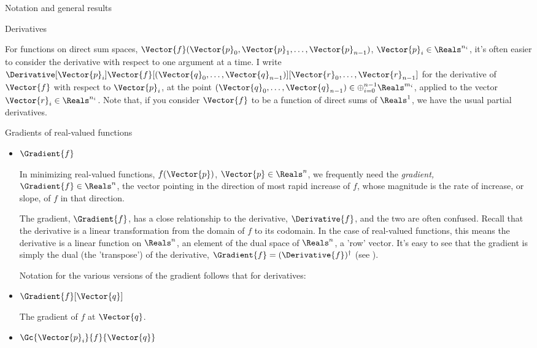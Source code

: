 \begin{plSection}{Notation and general results}
\begin{plSection}{Derivatives}
\begin{itemize}
For functions on direct sum spaces,
$\Vector{f}(\Vector{p}_0,\Vector{p}_1,\ldots,
\Vector{p}_{n-1})$, 
$\Vector{p}_i \in \Reals^{n_i}$,
it's often easier to consider the derivative
with respect to one argument at a time.
I write 
$\Derivative[\Vector{p}_i]{\Vector{f}}
[(\Vector{q}_0,\ldots,\Vector{q}_{n-1})]
[\Vector{r}_0,\ldots,\Vector{r}_{n-1}]$
for the derivative of $\Vector{f}$ with respect to $\Vector{p}_i$,
at the point 
$(\Vector{q}_0,\ldots,\Vector{q}_{n-1})
 \in \oplus_{i=0}^{n-1} \Reals^{m_i}$,
applied to the vector $\Vector{r}_i \in \Reals^{n_i}$.
Note that, if you consider $\Vector{f}$ to be a function
of direct sums of $\Reals^1$, we have the usual
partial derivatives.

\end{itemize}

\begin{plSection}{Gradients of real-valued functions}
\label{sec:gradients}

\begin{itemize}

\item $\Gradient{f}$

In minimizing real-valued functions, $f(\Vector{p})$, $\Vector{p} \in \Reals^n$,
we frequently need
the {\it gradient,} $\Gradient{f} \in \Reals^n$,
the vector pointing in the direction of most rapid increase of $f$,
whose magnitude is the rate of increase, or slope,
of $f$ in that direction.

The gradient, $\Gradient{f}$,
has a close relationship to the derivative, $\Derivative{f}$,
and the two are often confused.
Recall that the derivative is a linear transformation
from the domain of $f$ to its codomain.
In the case of real-valued functions,
this means the derivative is a linear function on $\Reals^n$,
an element of the dual space of $\Reals^n$, a 'row' vector.
It's easy to see that the gradient is simply the dual (the 'transpose')
of the derivative, $\Gradient{f} = (\Derivative{f})^{\dagger}$
(see ).

Notation for the various versions of the gradient
follows that for derivatives:

\item $\Gradient{f}[\Vector{q}]$

The gradient of $f$ at $\Vector{q}$.

\item $\Gc{\Vector{p}_i}{f}{\Vector{q}}$


\end{itemize}
\end{plSection}
\end{plSection}
\end{plSection}
